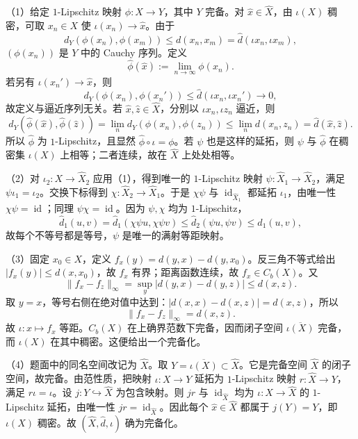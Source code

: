 （1）给定 $1$-Lipschitz 映射 $\phi:X\to Y$，其中 $Y$ 完备。对 $\widehat x\in\widehat X$，由 $\iota(X)$ 稠密，可取 $x_n\in X$ 使 $\iota(x_n)\to\widehat x$。由于
\[
d_Y(\phi(x_n),\phi(x_m))\le d(x_n,x_m)=\widehat d(\iota x_n,\iota x_m),
\]
$(\phi(x_n))$ 是 $Y$ 中的 Cauchy 序列。定义
\[
\widehat\phi(\widehat x):=\lim_{n\to\infty}\phi(x_n).
\]
若另有 $\iota(x_n')\to\widehat x$，则
\[
d_Y(\phi(x_n),\phi(x_n'))\le \widehat d(\iota x_n,\iota x_n')\to0,
\]
故定义与逼近序列无关。若 $\widehat x,\widehat z\in\widehat X$，分别以 $\iota x_n,\iota z_n$ 逼近，则
\[
d_Y(\widehat\phi(\widehat x),\widehat\phi(\widehat z))
=\lim_n d_Y(\phi(x_n),\phi(z_n))
\le\lim_n d(x_n,z_n)=\widehat d(\widehat x,\widehat z).
\]
所以 $\widehat\phi$ 为 $1$-Lipschitz，且显然 $\widehat\phi\circ\iota=\phi$。若 $\psi$ 也是这样的延拓，则 $\psi$ 与 $\widehat\phi$ 在稠密集 $\iota(X)$ 上相等；二者连续，故在 $\widehat X$ 上处处相等。

（2）对 $\iota_2:X\to\widehat X_2$ 应用（1），得到唯一的 $1$-Lipschitz 映射 $\psi:\widehat X_1\to\widehat X_2$，满足 $\psi\iota_1=\iota_2$。交换下标得到 $\chi:\widehat X_2\to\widehat X_1$。于是 $\chi\psi$ 与 $\operatorname{id}_{\widehat X_1}$ 都延拓 $\iota_1$，由唯一性 $\chi\psi=\operatorname{id}$；同理 $\psi\chi=\operatorname{id}$。因为 $\psi,\chi$ 均为 $1$-Lipschitz，
\[
\widehat d_1(u,v)=\widehat d_1(\chi\psi u,\chi\psi v)
\le\widehat d_2(\psi u,\psi v)\le\widehat d_1(u,v),
\]
故每个不等号都是等号，$\psi$ 是唯一的满射等距映射。

（3）固定 $x_0\in X$，定义 $f_x(y)=d(y,x)-d(y,x_0)$。反三角不等式给出 $|f_x(y)|\le d(x,x_0)$，故 $f_x$ 有界；距离函数连续，故 $f_x\in C_b(X)$。又
\[
\|f_x-f_z\|_\infty
=\sup_y|d(y,x)-d(y,z)|\le d(x,z).
\]
取 $y=x$，等号右侧在绝对值中达到：$|d(x,x)-d(x,z)|=d(x,z)$，所以
\[
\|f_x-f_z\|_\infty=d(x,z).
\]
故 $\iota:x\mapsto f_x$ 等距。$C_b(X)$ 在上确界范数下完备，因而闭子空间 $\overline{\iota(X)}$ 完备，而 $\iota(X)$ 在其中稠密。这便给出一个完备化。

（4）题面中的同名空间改记为 $\widehat X$。取 $Y=\overline{\iota(X)}\subset\widehat X$。它是完备空间 $\widehat X$ 的闭子空间，故完备。由范性质，把映射 $\iota:X\to Y$ 延拓为 $1$-Lipschitz 映射 $r:\widehat X\to Y$，满足 $r\iota=\iota$。设 $j:Y\hookrightarrow\widehat X$ 为包含映射。则 $jr$ 与 $\operatorname{id}_{\widehat X}$ 均为 $\iota:X\to\widehat X$ 的 $1$-Lipschitz 延拓，由唯一性 $jr=\operatorname{id}_{\widehat X}$。因此每个 $\widehat x\in\widehat X$ 都属于 $j(Y)=Y$，即 $\iota(X)$ 稠密。故 $(\widehat X,\widehat d,\iota)$ 确为完备化。

